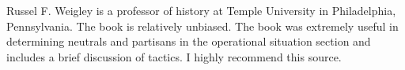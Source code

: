 Russel F. Weigley is a professor of history at Temple University in
Philadelphia, Pennsylvania. The book is relatively unbiased. The book was
extremely useful in determining neutrals and partisans in the operational
situation section and includes a brief discussion of tactics. I highly recommend
this source.
